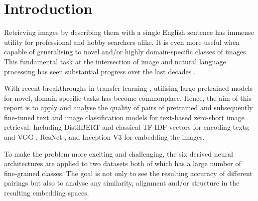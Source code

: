 \section{Introduction}

Retrieving images by describing them with a single English sentence has immense utility for professional and hobby searchers alike. It is even more useful when capable of generalising to novel and/or highly domain-specific classes of images. This fundamental task at the intersection of image and natural language processing has seen substantial progress over the last decades \cite{gudivada1995content,li2011text,reed2016learning,latif2019content}.

With recent breakthroughs in transfer learning \cite{weiss2016survey}, utilising large pretrained models for novel, domain-specific tasks has become commonplace. Hence, the aim of this report is to apply and analyse the quality of pairs of pretrained and subsequently fine-tuned text and image classification models for text-based zero-short image retrieval. Including DistilBERT \cite{sanh2019distilbert} and classical TF-IDF vectors for encoding texts; and VGG \cite{simonyan2014very}, ResNet \cite{he2016deep}, and Inception V3 \cite{szegedy2016rethinking} for embedding the images.

To make the problem more exciting and challenging, the six derived neural architectures are applied to two datasets both of which has a large number of fine-grained classes. The goal is not only to see the resulting accuracy of different pairings but also to analyse any similarity, alignment and/or structure in the resulting embedding spaces.
